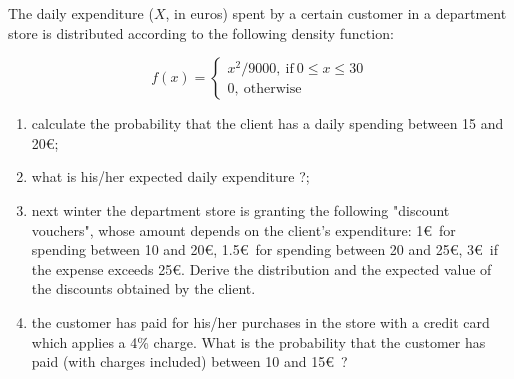 \begin{question}
The daily expenditure ($X$, in euros) spent by a certain customer in a department store is distributed according to the following density function:

\begin{equation*}
	f(x) = 
	\begin{cases}
		x^2/9000,~\textrm{if}~0 \leq x \leq 30\\
		0,~\textrm{otherwise}		
	\end{cases}
\end{equation*}

\begin{enumerate}[label={\emph{\alph*})}]
\item calculate the probability that the client has a daily spending between 15 and 20\euro;
\item what is his/her expected daily expenditure ?;
\item next winter the department store is granting the following "discount vouchers", whose amount depends on the client's expenditure: 1\euro~for spending between 10 and 20\euro, 1.5\euro~for spending between 20 and 25\euro,
3\euro~if the expense exceeds 25\euro. Derive the distribution and the expected value of the discounts obtained by the client.
\item the customer has paid for his/her purchases in the store with a credit card which applies a 4\% charge. What is the probability that the customer has paid (with charges included) between 10 and 15\euro~?
\end{enumerate}
\end{question}

